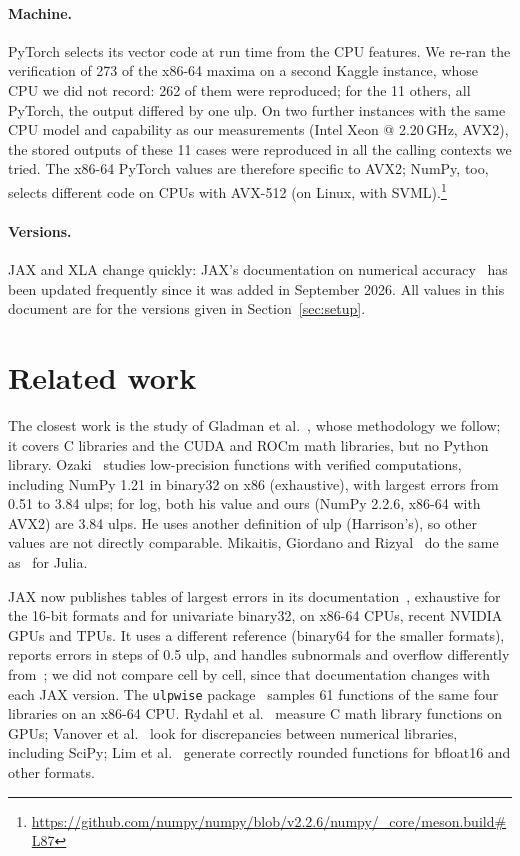 \documentclass[11pt,a4paper]{article}
\begin{document}
\paragraph{Machine.} PyTorch selects its vector code at run time from the CPU features. We re-ran the verification of 273 of the x86-64 maxima on a second Kaggle instance, whose CPU we did not record: 262 of them were reproduced; for the 11 others, all PyTorch, the output differed by one ulp. On two further instances with the same CPU model and capability as our measurements (Intel Xeon @ 2.20\,GHz, AVX2), the stored outputs of these 11 cases were reproduced in all the calling contexts we tried. The x86-64 PyTorch values are therefore specific to AVX2; NumPy, too, selects different code on CPUs with AVX-512 (on Linux, with SVML).\footnote{\url{https://github.com/numpy/numpy/blob/v2.2.6/numpy/_core/meson.build\#L87}}

\paragraph{Versions.} JAX and XLA change quickly: JAX's documentation on numerical accuracy~\cite{JAXaccuracy2026} has been updated frequently since it was added in September 2026. All values in this document are for the versions given in Section~\ref{sec:setup}.

\section{Related work}\label{sec:related}
The closest work is the study of Gladman et al.~\cite{GIMOZ2026}, whose methodology we follow; it covers C libraries and the CUDA and ROCm math libraries, but no Python library. Ozaki~\cite{Ozaki2025} studies low-precision functions with verified computations, including NumPy 1.21 in binary32 on x86 (exhaustive), with largest errors from 0.51 to 3.84 ulps; for log, both his value and ours (NumPy 2.2.6, x86-64 with AVX2) are 3.84 ulps. He uses another definition of ulp (Harrison's), so other values are not directly comparable. Mikaitis, Giordano and Rizyal~\cite{MGR2025} do the same as~\cite{GIMOZ2026} for Julia.

JAX now publishes tables of largest errors in its documentation~\cite{JAXaccuracy2026}, exhaustive for the 16-bit formats and for univariate binary32, on x86-64 CPUs, recent NVIDIA GPUs and TPUs. It uses a different reference (binary64 for the smaller formats), reports errors in steps of 0.5 ulp, and handles subnormals and overflow differently from~\cite{GIMOZ2026}; we did not compare cell by cell, since that documentation changes with each JAX version. The \texttt{ulpwise} package~\cite{ulpwise} samples 61 functions of the same four libraries on an x86-64 CPU. Rydahl et al.~\cite{Rydahl2023} measure C math library functions on GPUs; Vanover et al.~\cite{FPDiff2020} look for discrepancies between numerical libraries, including SciPy; Lim et al.~\cite{RLibm2021} generate correctly rounded functions for bfloat16 and other formats.
\end{document}
